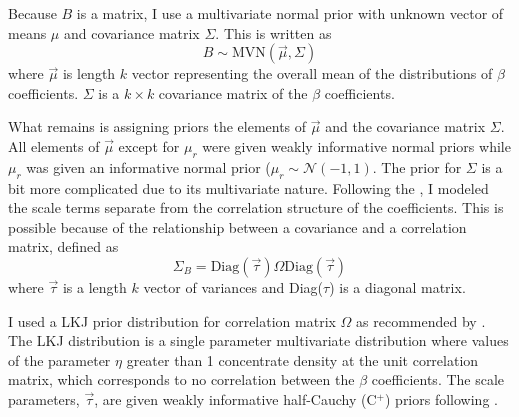 \documentclass[12pt,letterpaper]{article}
\begin{document}
Because \(B\) is a matrix, I use a multivariate normal prior with unknown vector of means \(\mu\) and covariance matrix \(\Sigma\). This is written as 
\begin{equation}
  B \sim \mathrm{MVN}(\vec{\mu}, \Sigma)
  \label{eq:beta_prior}
\end{equation}
where \(\vec{\mu}\) is length \(k\) vector representing the overall mean of the distributions of \(\beta\) coefficients. \(\Sigma\) is a \(k \times k\) covariance matrix of the \(\beta\) coefficients.

What remains is assigning priors the elements of \(\vec{\mu}\) and the covariance matrix \(\Sigma\). All elements of \(\vec{\mu}\) except for \(\mu_{r}\) were given weakly informative normal priors while \(\mu_{r}\) was given an informative normal prior (\(\mu_{r} \sim \mathcal{N}(-1, 1)\). The prior for \(\Sigma\) is a bit more complicated due to its multivariate nature. 
Following the \citet{stan-manual:2014}, I modeled the scale terms separate from the correlation structure of the coefficients. This is possible because of the relationship between a covariance and a correlation matrix, defined as 
\begin{equation}
  \Sigma_{B} = \text{Diag}(\vec{\tau}) \Omega \text{Diag}(\vec{\tau})
  \label{eq:covcor}
\end{equation}
where \(\vec{\tau}\) is a length \(k\) vector of variances and Diag(\(\tau\)) is a diagonal matrix.

I used a LKJ prior distribution for correlation matrix \(\Omega\) as recommended by \citet{stan-manual:2014}. The LKJ distribution is a single parameter multivariate distribution where values of the parameter \(\eta\) greater than 1 concentrate density at the unit correlation matrix, which corresponds to no correlation between the \(\beta\) coefficients. The scale parameters, \(\vec{\tau}\), are given weakly informative half-Cauchy (C\(^{+}\)) priors following \citet{Gelman2006a}.
\end{document}
